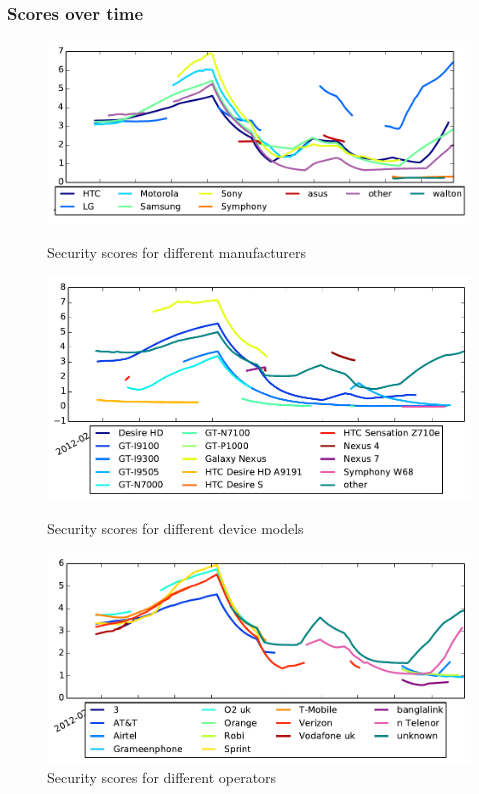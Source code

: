 \subsubsection{Scores over time}
\begin{figure}
\centering
\includegraphics[width=\columnwidth]{figures/security_score_manufacturer}
\caption{Security scores for different manufacturers}
\label{fig:security_score_manufacturer}
\includegraphics[width=\columnwidth]{figures/security_score_model}
\caption{Security scores for different device models}
\label{fig:security_score_model}
\includegraphics[width=\columnwidth]{figures/security_score_operator}
\caption{Security scores for different operators}
\label{fig:security_score_operator}

\end{figure}
